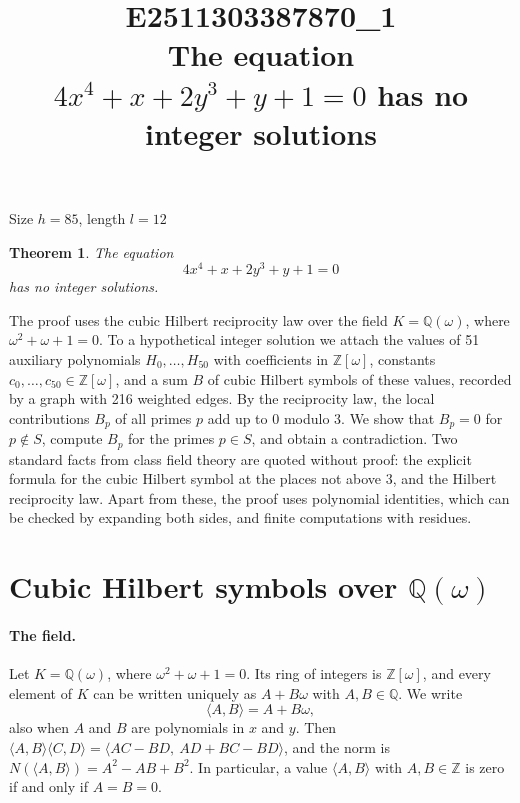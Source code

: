 \documentclass[11pt]{article}
\title{\textbf{E2511303387870\_1}\\[4pt] {\Large The equation $4x^{4}+x+2y^{3}+y+1=0$ has no integer solutions}}
\author{}
\date{}
\newtheorem{theorem}{Theorem}
\newcommand{\Z}{\mathbb{Z}}
\newcommand{\Q}{\mathbb{Q}}
\begin{document}
\maketitle
\vspace{-8ex}
\begin{center}
Size $h=85$, length $l=12$
\end{center}

\begin{theorem}\label{thm:main}
The equation
\begin{equation}\label{eq:main}
4x^{4}+x+2y^{3}+y+1=0
\end{equation}
has no integer solutions.
\end{theorem}

The proof uses the cubic Hilbert reciprocity law over the field $K=\Q(\omega)$, where $\omega^2+\omega+1=0$. To a hypothetical integer solution we attach the values of 51 auxiliary polynomials $H_0,\dots,H_{50}$ with coefficients in $\Z[\omega]$, constants $c_0,\dots,c_{50}\in\Z[\omega]$, and a sum $B$ of cubic Hilbert symbols of these values, recorded by a graph with 216 weighted edges. By the reciprocity law, the local contributions $B_p$ of all primes $p$ add up to $0$ modulo $3$. We show that $B_p=0$ for $p\notin S$, compute $B_p$ for the primes $p\in S$, and obtain a contradiction. Two standard facts from class field theory are quoted without proof: the explicit formula for the cubic Hilbert symbol at the places not above $3$, and the Hilbert reciprocity law. Apart from these, the proof uses polynomial identities, which can be checked by expanding both sides, and finite computations with residues.


\section{\texorpdfstring{Cubic Hilbert symbols over $\Q(\omega)$}{Cubic Hilbert symbols over Q(w)}}\label{sec:symbols}

\paragraph{The field.} Let $K=\Q(\omega)$, where $\omega^2+\omega+1=0$. Its ring of integers is $\Z[\omega]$, and every element of $K$ can be written uniquely as $A+B\omega$ with $A,B\in\Q$. We write
\[
\langle A,B\rangle=A+B\omega,
\]
also when $A$ and $B$ are polynomials in $x$ and $y$. Then $\langle A,B\rangle\langle C,D\rangle=\langle AC-BD,\ AD+BC-BD\rangle$, and the norm is $N(\langle A,B\rangle)=A^2-AB+B^2$. In particular, a value $\langle A,B\rangle$ with $A,B\in\Z$ is zero if and only if $A=B=0$.
\end{document}
